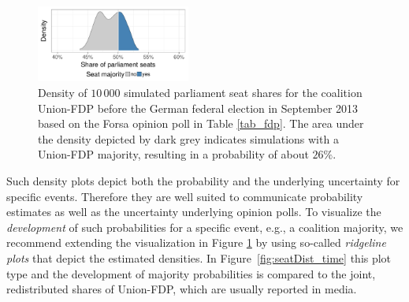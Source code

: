 \documentclass[smallcondensed]{svjour3}     %
\begin{document}
\begin{figure}[H]\centering
\includegraphics[width=0.45\textwidth]{figures/2013_forsa_cdufdp_lastPreelectionPoll.pdf}
\caption{Density of $10\,000$ simulated parliament seat shares for the coalition
Union-FDP before the German federal election in September 2013 based on the Forsa
opinion poll in Table \ref{tab_fdp}. The area under the density depicted by
dark grey indicates simulations with a Union-FDP majority, resulting in a
probability of about $26\%$.
\label{fig:seatDist}
}
\end{figure}

Such density plots depict both the probability and the underlying
uncertainty for specific events. Therefore they are well suited to communicate
probability estimates as well as the uncertainty underlying opinion polls.
To visualize the {\it development} of such probabilities
for a specific event, e.g., a coalition majority, we recommend extending the
visualization in Figure \ref{fig:seatDist} by using so-called
\emph{ridgeline plots} \citep{wilke_2017} that depict the estimated densities.
In Figure~\ref{fig:seatDist_time} this plot type and the development of majority
probabilities is compared to the joint, redistributed shares of Union-FDP, which
are usually reported in media.
\end{document}
